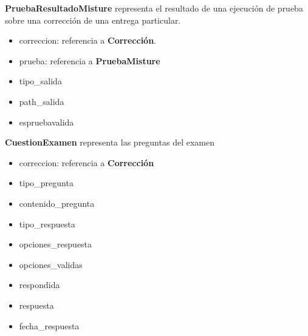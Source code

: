 \textbf{PruebaResultadoMisture} representa el resultado de una ejecución de prueba sobre una corrección de una entrega particular.
\begin{itemize}
\item correccion: referencia a \textbf{Corrección}.
\item prueba: referencia a \textbf{PruebaMisture}
\item tipo\_salida
\item path\_salida
\item espruebavalida
\end{itemize}

\textbf{CuestionExamen} representa las preguntas del examen
\begin{itemize}
\item correccion: referencia a \textbf{Corrección}
\item tipo\_pregunta
\item contenido\_pregunta
\item tipo\_respuesta
\item opciones\_respuesta
\item opciones\_validas
\item respondida
\item respuesta
\item fecha\_respuesta
\end{itemize}
    
